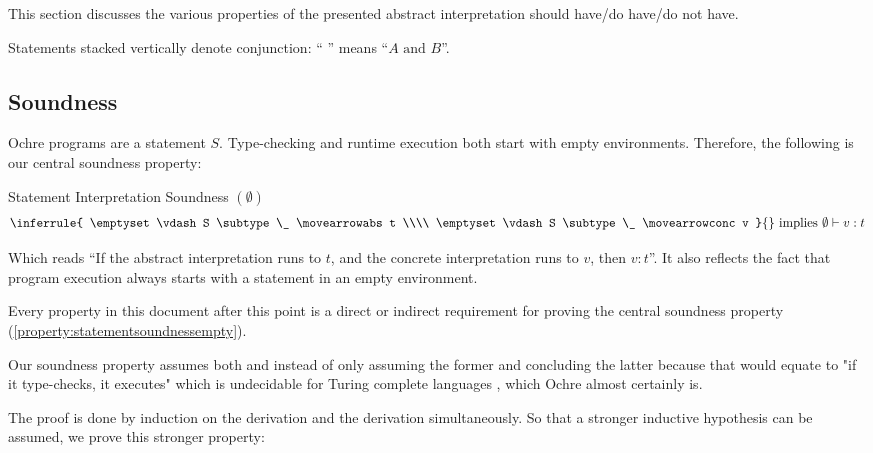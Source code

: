 \documentclass[12pt,twoside]{report}
\begin{document}
This section discusses the various properties of the presented abstract interpretation should have/do have/do not have.

Statements stacked vertically denote conjunction: ``
''
means ``$A \text{ and } B$''.

\subsection{Soundness}
Ochre programs are a statement $S$. Type-checking and runtime execution both start with empty environments. Therefore, the following is our central soundness property:

  \noindent
  \begin{Property}{Statement Interpretation Soundness $(\emptyset)$}{}
    \[
      \oimplies{
        \inferrule{
          \emptyset \vdash S \subtype \_ \movearrowabs t \\\\
          \emptyset \vdash S \subtype \_ \movearrowconc v
        }{}
      }{
        \emptyset \vdash v: t
      }
    \]
  \end{Property}
  \label{property:statementsoundnessempty}

Which reads ``If the abstract interpretation runs to $t$, and the concrete interpretation runs to $v$, then $v:t$''. It also reflects the fact that program execution always starts with a statement in an empty environment.

Every property in this document after this point is a direct or indirect requirement for proving the central soundness property (\ref{property:statementsoundnessempty}).

Our soundness property assumes both \movearrowabs and \movearrowconc instead of only assuming the former and concluding the latter because that would equate to "if it type-checks, it executes" which is undecidable for Turing complete languages \citep{turingComputableNumbersApplication1937}, which Ochre almost certainly is.

The proof is done by induction on the \movearrowabs derivation and the \movearrowconc derivation simultaneously. So that a stronger inductive hypothesis can be assumed, we prove this stronger property:
\end{document}

